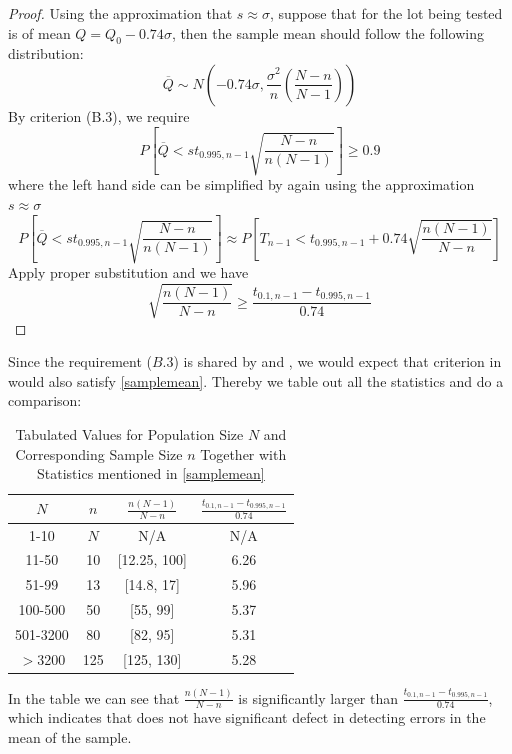 \documentclass[12pt]{article}
\begin{document}
\begin{proof}
    Using the approximation that $s\approx\sigma$, suppose that for the lot being tested is of mean $Q = Q_0 - 0.74\sigma$, then the sample mean should follow the following distribution:
    $$
    \overline{Q} \sim N\left( -0.74\sigma, \dfrac{\sigma^2}{n}\left( \dfrac{N-n}{N-1} \right) \right)
    $$
    By criterion (B.3), we require
    $$
    P\left[ \overline{Q} < st_{0.995, n-1}\sqrt{\dfrac{N-n}{n(N-1)}} \right] \geq 0.9
    $$
    where the left hand side can be simplified by again using the approximation $s\approx\sigma$
    $$
    P\left[ \overline{Q} < st_{0.995, n-1}\sqrt{\dfrac{N-n}{n(N-1)}} \right] \approx P\left[ T_{n-1} < t_{0.995,n-1} + 0.74\sqrt{\dfrac{n(N-1)}{N-n}} \right]
    $$
    Apply proper substitution and we have
    $$
    \sqrt{\dfrac{n(N-1)}{N-n}} \geq \dfrac{t_{0.1,n-1} - t_{0.995,n-1}}{0.74}
    $$
\end{proof}

Since the requirement ($B.3$) is shared by \cite{JJF2005} and \cite{OIML2016}, we would expect that criterion in \cite{JJF2005} would also satisfy \eqref{samplemean}. Thereby we table out all the statistics and do a comparison:

\begin{table}[htbp]
    \centering
    \begin{tabular}{cccc}
        \toprule
        $N$ & $n$ & $\frac{n(N-1)}{N-n}$ & $\frac{t_{0.1,n-1} - t_{0.995,n-1}}{0.74}$ \\
        \midrule
        1-10 & $N$ & N/A & N/A \\
        11-50 & 10 & [12.25, 100] & 6.26 \\
        51-99 & 13 & [14.8, 17] & 5.96 \\
        100-500 & 50 & [55, 99] & 5.37 \\ 
        501-3200 & 80 & [82, 95] & 5.31 \\
        $>$3200 & 125 & [125, 130] & 5.28 \\
        \bottomrule
    \end{tabular}
    \caption{Tabulated Values for Population Size $N$ and Corresponding Sample Size $n$ Together with Statistics mentioned in \eqref{samplemean}}
\end{table}

In the table we can see that $\frac{n(N-1)}{N-n}$ is significantly larger than $\frac{t_{0.1,n-1} - t_{0.995,n-1}}{0.74}$, which indicates that \cite{JJF2005} does not have significant defect in detecting errors in the mean of the sample.
\end{document}
